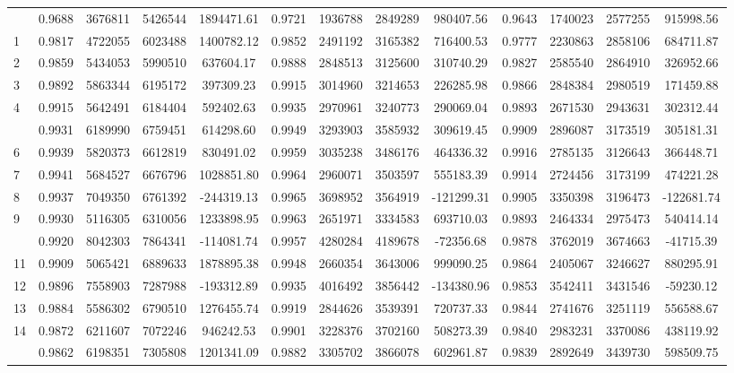 \documentclass[
  12pt,
]{article}
\begin{document}
\begin{longtable}[t]{lcccccccccccc}
\endfoot
\bottomrule
\endlastfoot
0 & 0.9688 & 3676811 & 5426544 & 1894471.61 & 0.9721 & 1936788 & 2849289 & 980407.56 & 0.9643 & 1740023 & 2577255 & 915998.56\\
1 & 0.9817 & 4722055 & 6023488 & 1400782.12 & 0.9852 & 2491192 & 3165382 & 716400.53 & 0.9777 & 2230863 & 2858106 & 684711.87\\
2 & 0.9859 & 5434053 & 5990510 & 637604.17 & 0.9888 & 2848513 & 3125600 & 310740.29 & 0.9827 & 2585540 & 2864910 & 326952.66\\
3 & 0.9892 & 5863344 & 6195172 & 397309.23 & 0.9915 & 3014960 & 3214653 & 226285.98 & 0.9866 & 2848384 & 2980519 & 171459.88\\
4 & 0.9915 & 5642491 & 6184404 & 592402.63 & 0.9935 & 2970961 & 3240773 & 290069.04 & 0.9893 & 2671530 & 2943631 & 302312.44\\
\addlinespace
5 & 0.9931 & 6189990 & 6759451 & 614298.60 & 0.9949 & 3293903 & 3585932 & 309619.45 & 0.9909 & 2896087 & 3173519 & 305181.31\\
6 & 0.9939 & 5820373 & 6612819 & 830491.02 & 0.9959 & 3035238 & 3486176 & 464336.32 & 0.9916 & 2785135 & 3126643 & 366448.71\\
7 & 0.9941 & 5684527 & 6676796 & 1028851.80 & 0.9964 & 2960071 & 3503597 & 555183.39 & 0.9914 & 2724456 & 3173199 & 474221.28\\
8 & 0.9937 & 7049350 & 6761392 & -244319.13 & 0.9965 & 3698952 & 3564919 & -121299.31 & 0.9905 & 3350398 & 3196473 & -122681.74\\
9 & 0.9930 & 5116305 & 6310056 & 1233898.95 & 0.9963 & 2651971 & 3334583 & 693710.03 & 0.9893 & 2464334 & 2975473 & 540414.14\\
\addlinespace
10 & 0.9920 & 8042303 & 7864341 & -114081.74 & 0.9957 & 4280284 & 4189678 & -72356.68 & 0.9878 & 3762019 & 3674663 & -41715.39\\
11 & 0.9909 & 5065421 & 6889633 & 1878895.38 & 0.9948 & 2660354 & 3643006 & 999090.25 & 0.9864 & 2405067 & 3246627 & 880295.91\\
12 & 0.9896 & 7558903 & 7287988 & -193312.89 & 0.9935 & 4016492 & 3856442 & -134380.96 & 0.9853 & 3542411 & 3431546 & -59230.12\\
13 & 0.9884 & 5586302 & 6790510 & 1276455.74 & 0.9919 & 2844626 & 3539391 & 720737.33 & 0.9844 & 2741676 & 3251119 & 556588.67\\
14 & 0.9872 & 6211607 & 7072246 & 946242.53 & 0.9901 & 3228376 & 3702160 & 508273.39 & 0.9840 & 2983231 & 3370086 & 438119.92\\
\addlinespace
15 & 0.9862 & 6198351 & 7305808 & 1201341.09 & 0.9882 & 3305702 & 3866078 & 602961.87 & 0.9839 & 2892649 & 3439730 & 598509.75\\

\end{longtable}
\end{document}
